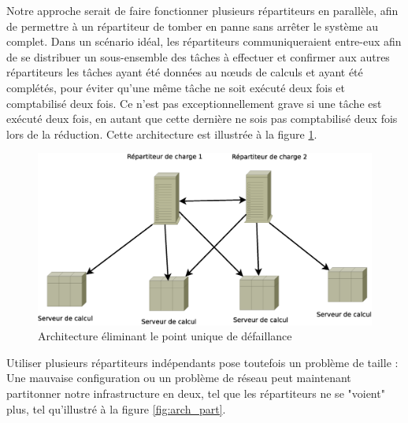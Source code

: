Notre approche serait de faire fonctionner plusieurs répartiteurs en parallèle, afin de permettre à 
un répartiteur de tomber en panne sans arrêter le système au complet. Dans un scénario idéal, les répartiteurs 
communiqueraient entre-eux afin de se distribuer un sous-ensemble des tâches à effectuer et confirmer aux autres répartiteurs 
les tâches ayant été données au nœuds de calculs et ayant été complétés, pour éviter qu'une même tâche ne soit exécuté deux fois
et comptabilisé deux fois. Ce n'est pas exceptionnellement grave si une tâche est exécuté deux fois, en autant que cette dernière ne sois 
pas comptabilisé deux fois lors de la réduction. Cette architecture est illustrée à la figure  \ref{fig:arch_2}.

\begin{figure}
  \includegraphics[width=\linewidth]{Arch_2.eps}
  \caption{Architecture éliminant le point unique de défaillance}
  \label{fig:arch_2}
\end{figure}




Utiliser plusieurs répartiteurs indépendants pose toutefois un problème de taille : Une mauvaise configuration ou un problème 
de réseau peut maintenant partitonner notre infrastructure en deux, tel que les répartiteurs ne se "voient" plus, tel qu'illustré à la figure \ref{fig:arch_part}.

